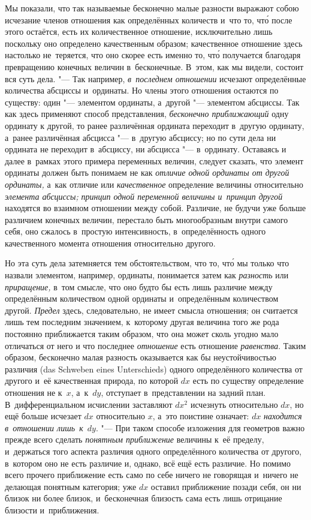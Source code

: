Мы показали, что так называемые бесконечно малые разности выражают собою
исчезание членов отношения как определённых количеств и~что то, чт\'{о} после этого
остаётся, есть их количественное отношение, исключительно лишь поскольку оно
определено качественным образом; качественное отношение здесь настолько
не~теряется, что оно скорее есть именно то, чт\'{о} получается благодаря
превращению конечных величин в~бесконечные. В~этом, как мы видели, состоит вся
суть дела. "--- Так например, {\em в~последнем отношении} исчезают определённые
количества абсциссы и~ординаты. Но члены этого отношения остаются по существу:
один "--- элементом ординаты, а~другой "--- элементом абсциссы. Так как здесь
применяют способ представления, {\em бесконечно приближающий} одну ординату
к другой, то ранее различённая ордината переходит в~другую ординату, а~ранее
различённая абсцисса "--- в~другую абсциссу; но по сути дела ни ордината
не переходит в~абсциссу, ни абсцисса "--- в~ординату. Оставаясь
и далее в~рамках этого примера переменных
величин, следует сказать, что элемент ординаты должен быть понимаем не как
{\em отличие одной ординаты от другой ординаты,} а~как отличие или
{\em качественное} определение величины относительно {\em элемента абсциссы;}
{\em принцип одной переменной величины и~принцип другой} находятся во взаимном
отношении между собой. Различие, не будучи уже больше различием конечных
величин, перестало быть многообразным внутри самого себя, оно сжалось в~простую
интенсивность, в~определённость одного качественного момента отношения
относительно другого.

Но эта суть дела затемняется тем обстоятельством, что то, чт\'{о} мы только что
назвали элементом, например, ординаты, понимается затем как {\em разность} или
{\em приращение,} в~том смысле, что оно будто бы есть лишь различие между
определённым количеством одной ординаты и~определённым количеством другой.
{\em Предел} здесь, следовательно, не имеет смысла отношения; он считается лишь
тем последним значением, к~которому другая величина того же рода постоянно
приближается таким образом, что она может сколь угодно мало отличаться от него
и что последнее {\em отношение} есть отношение {\em равенства}. Таким образом,
бесконечно малая разность оказывается как бы неустойчивостью различия (das
Schweben eines Unter\-schieds) одного определённого количества от другого и~её
качественная природа, по которой $dx$ есть по существу определение отношения не
к~$x$, а~к~$dy$, отступает в~представлении на задний план. В~дифференциальном
исчислении заставляют $dx^2$ исчезнуть относительно $dx$, но ещё больше
исчезает $dx$ относительно $x$, а~это поистине означает: $dx$
{\em находится в~отношении лишь~к}~$dy$. "--- При таком способе изложения для
геометров важно прежде всего сделать {\em понятным приближение}
величины к~её пределу, и~держаться того аспекта различия одного
определённого количества от другого, в~котором оно не есть различие и, однако,
всё ещё есть различие. Но помимо всего прочего приближение есть само по себе
ничего не говорящая и~ничего не делающая понятным категория; уже $dx$ оставил
приближение позади себя, он ни близок ни более близок, и~бесконечная близость
сама есть лишь отрицание близости и~приближения.

